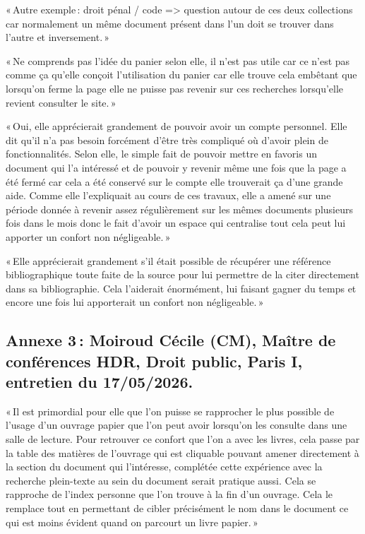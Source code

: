 « Autre exemple : droit pénal / code => question autour de ces deux collections car normalement un même document présent dans l’un doit se trouver dans l’autre et inversement. » 

« Ne comprends pas l’idée du panier selon elle, il n’est pas utile car ce n’est pas comme ça qu’elle conçoit l’utilisation du panier car elle trouve cela embêtant que lorsqu’on ferme la page elle ne puisse pas revenir sur ces recherches lorsqu’elle revient consulter le site. » 

« Oui, elle apprécierait grandement de pouvoir avoir un compte personnel. Elle dit qu’il n’a pas besoin forcément d’être très compliqué où d’avoir plein de fonctionnalités. Selon elle, le simple fait de pouvoir mettre en favoris un document qui l’a intéressé et de pouvoir y revenir même une fois que la page a été fermé car cela a été conservé sur le compte elle trouverait ça d’une grande aide. Comme elle l’expliquait au cours de ces travaux, elle a amené sur une période donnée à revenir assez régulièrement sur les mêmes documents plusieurs fois dans le mois donc le fait d’avoir un espace qui centralise tout cela peut lui apporter un confort non négligeable. » 

« Elle apprécierait grandement s’il était possible de récupérer une référence bibliographique toute faite de la source pour lui permettre de la citer directement dans sa bibliographie. Cela l’aiderait énormément, lui faisant gagner du temps et encore une fois lui apporterait un confort non négligeable. » 

\subsection*{Annexe 3 : Moiroud Cécile (CM), Maître de conférences HDR, Droit public, Paris I, entretien du 17/05/2026.}

« Il est primordial pour elle que l’on puisse se rapprocher le plus possible de l’usage d’un ouvrage papier que l’on peut avoir lorsqu’on les consulte dans une salle de lecture. Pour retrouver ce confort que l’on a avec les livres, cela passe par la table des matières de l’ouvrage qui est cliquable pouvant amener directement à la section du document qui l’intéresse, complétée cette expérience avec la recherche plein-texte au sein du document serait pratique aussi. Cela se rapproche de l’index personne que l’on trouve à la fin d’un ouvrage. Cela le remplace tout en permettant de cibler précisément le nom dans le document ce qui est moins évident quand on parcourt un livre papier. » 

